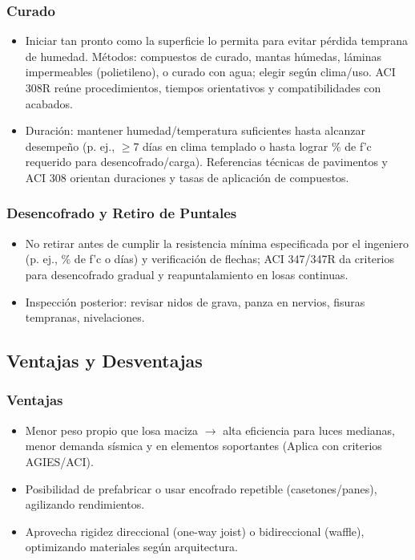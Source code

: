 \documentclass[12pt,a4paper]{article}
\begin{document}
	\subsubsection{ Curado}
	\begin{itemize}
		\item Iniciar tan pronto como la superficie lo permita para evitar pérdida temprana de humedad. Métodos: compuestos de curado, mantas húmedas, láminas impermeables (polietileno), o curado con agua; elegir según clima/uso. ACI 308R reúne procedimientos, tiempos orientativos y compatibilidades con acabados.
		\item Duración: mantener humedad/temperatura suficientes hasta alcanzar desempeño (p. ej., $\geq$7 días en clima templado o hasta lograr \% de f’c requerido para desencofrado/carga). Referencias técnicas de pavimentos y ACI 308 orientan duraciones y tasas de aplicación de compuestos.
	\end{itemize}
	
	\subsubsection{ Desencofrado y Retiro de Puntales}
	\begin{itemize}
		\item No retirar antes de cumplir la resistencia mínima especificada por el ingeniero (p. ej., \% de f’c o días) y verificación de flechas; ACI 347/347R da criterios para desencofrado gradual y reapuntalamiento en losas continuas.
		\item Inspección posterior: revisar nidos de grava, panza en nervios, fisuras tempranas, nivelaciones.
	\end{itemize}
	
	\subsection{Ventajas y Desventajas}
	
	\subsubsection{Ventajas}
	\begin{itemize}
		\item Menor peso propio que losa maciza $\rightarrow$ alta eficiencia para luces medianas, menor demanda sísmica y en elementos soportantes (Aplica con criterios AGIES/ACI).
		\item Posibilidad de prefabricar o usar encofrado repetible (casetones/panes), agilizando rendimientos.
		\item Aprovecha rigidez direccional (one-way joist) o bidireccional (waffle), optimizando materiales según arquitectura.
	\end{itemize}
	
\end{document}
